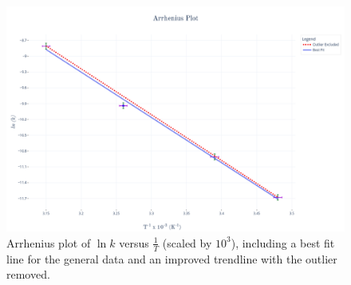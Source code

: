 \begin{figure}[!htb]
    \centering
    \includegraphics[width=1.0\textwidth]{fig/images/arrhenius.png}
    \caption{Arrhenius plot of $\ln{k}$ versus $\frac{1}{T}$ (scaled by $10^3$), including a best fit line for the general data and an improved trendline with the outlier removed.}
    \label{fig:arrhenius}
\end{figure}